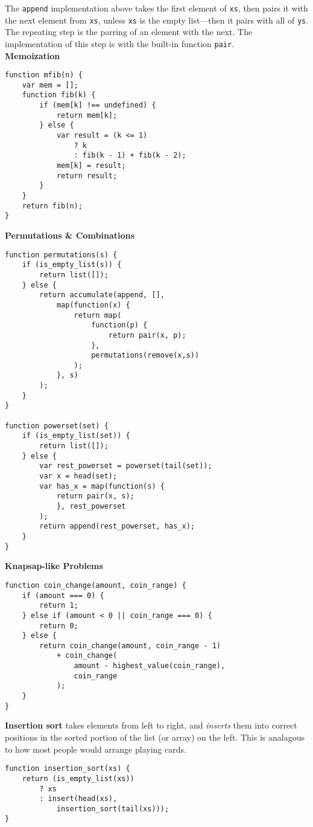 \documentclass[a4paper]{article} \usepackage[backend=biber, style=numeric, sorting=none]{biblatex}
\begin{document}
\begin{multicols*}{4}
The \texttt{append} implementation above takes the first element of \texttt{xs}, then pairs it with the next element from \texttt{xs}, unless \texttt{xs} is the empty list---then it pairs with all of \texttt{ys}. The repeating step is the parring of an element with the next. The implementation of this step is with the built-in function \texttt{pair}.\\

{\small\textbf{Memoization}}
\begin{verbatim}
function mfib(n) {
    var mem = [];
    function fib(k) {
        if (mem[k] !== undefined) {
            return mem[k];
        } else {
            var result = (k <= 1)
                ? k
                : fib(k - 1) + fib(k - 2);
            mem[k] = result;
            return result;
        }
    }
    return fib(n);
}
\end{verbatim}

{\small\textbf{Permutations \& Combinations}}
\begin{verbatim}
function permutations(s) {
    if (is_empty_list(s)) {
        return list([]);
    } else {
        return accumulate(append, [],
            map(function(x) { 
                return map(
                    function(p) {
                        return pair(x, p);
                    }, 
                    permutations(remove(x,s))
                );
            }, s)
        );
    }
}

function powerset(set) {
    if (is_empty_list(set)) {
        return list([]);
    } else {
        var rest_powerset = powerset(tail(set));
        var x = head(set);
        var has_x = map(function(s) {
            return pair(x, s);
            }, rest_powerset
        );
        return append(rest_powerset, has_x);
    }
}
\end{verbatim}

{\small\textbf{Knapsap-like Problems}}

\begin{verbatim}
function coin_change(amount, coin_range) {
    if (amount === 0) {
        return 1;
    } else if (amount < 0 || coin_range === 0) {
        return 0;
    } else {
        return coin_change(amount, coin_range - 1)
            + coin_change(
                amount - highest_value(coin_range),
                coin_range
            );
    }
}
\end{verbatim}

{\small\textbf{Insertion sort}} takes elements from left to right, and \textit{inserts} them into correct positions in the sorted portion of the list (or array) on the left. This is analagous to how most people would arrange playing cards.
\begin{verbatim}
function insertion_sort(xs) {
    return (is_empty_list(xs))
        ? xs
        : insert(head(xs),
            insertion_sort(tail(xs)));
}


\end{verbatim}
\end{multicols*}
\end{document}
